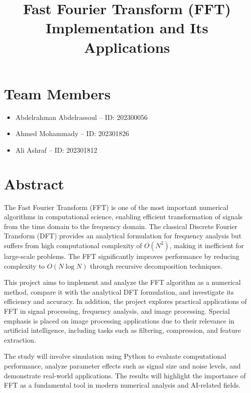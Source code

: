 \documentclass[12pt]{article}
\title{\textbf{Fast Fourier Transform (FFT) Implementation and Its Applications}}
\author{}
\date{}
\begin{document}
\maketitle

\section*{Team Members}
\begin{itemize}
    \item Abdelrahman Abdelrassoul -- ID: 202300056
    \item Ahmed Mohammady -- ID: 202301826
    \item Ali Ashraf -- ID: 202301812
\end{itemize}

\section*{Abstract}

The Fast Fourier Transform (FFT) is one of the most important numerical algorithms in computational science, enabling efficient transformation of signals from the time domain to the frequency domain. The classical Discrete Fourier Transform (DFT) provides an analytical formulation for frequency analysis but suffers from high computational complexity of $O(N^2)$, making it inefficient for large-scale problems. The FFT significantly improves performance by reducing complexity to $O(N \log N)$ through recursive decomposition techniques.

This project aims to implement and analyze the FFT algorithm as a numerical method, compare it with the analytical DFT formulation, and investigate its efficiency and accuracy. In addition, the project explores practical applications of FFT in signal processing, frequency analysis, and image processing. Special emphasis is placed on image processing applications due to their relevance in artificial intelligence, including tasks such as filtering, compression, and feature extraction.

The study will involve simulation using Python to evaluate computational performance, analyze parameter effects such as signal size and noise levels, and demonstrate real-world applications. The results will highlight the importance of FFT as a fundamental tool in modern numerical analysis and AI-related fields.
\end{document}
